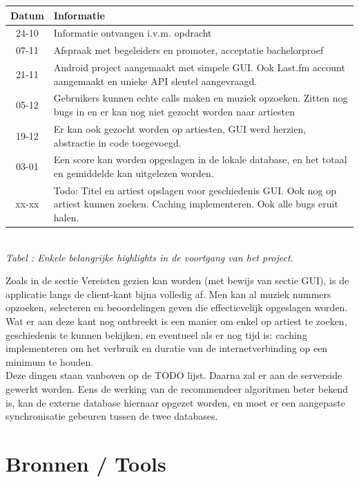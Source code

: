 \documentclass[11pt,a4paper]{article}
\newcounter{tabc}
\newcommand{\tabID} {%
   \stepcounter{tabc}%
   \thetabc}
\begin{document}
	\begin{tabular}{| c | p{\linewidth} | }
	\hline
	Datum & Informatie \\ \hline \hline 
	24-10 & Informatie ontvangen i.v.m. opdracht \\ \hline
	07-11 & Afspraak met begeleiders en promoter, acceptatie bachelorproef \\ \hline
	21-11 & Android project aangemaakt met simpele GUI. Ook Last.fm account aangemaakt en unieke API sleutel aangevraagd. \\ \hline
	05-12 & Gebruikers kunnen echte calls maken en muziek opzoeken. Zitten nog bugs in en er kan nog niet gezocht worden naar artiesten \\ \hline
	19-12 & Er kan ook gezocht worden op artiesten, GUI werd herzien, abstractie in code toegevoegd. \\ \hline
	03-01 & Een score kan worden opgeslagen in de lokale database, en het totaal en gemiddelde kan uitgelezen worden. \\ \hline
	xx-xx & Todo: Titel en artiest opslagen voor geschiedenis GUI. Ook nog op artiest kunnen zoeken. Caching implementeren. Ook alle bugs eruit halen. \\ \hline
	
	\end{tabular} \\ 
	\small \textit{Tabel \tabID : Enkele belangrijke highlights in de voortgang van het project.} \newline \normalsize
	

Zoals in de sectie Vereisten gezien kan worden (met bewijs van sectie GUI), is de applicatie langs de client-kant bijna volledig af. Men kan al muziek nummers opzoeken, selecteren en beoordelingen geven die effectievelijk opgeslagen worden. Wat er aan deze kant nog ontbreekt is een manier om enkel op artiest te zoeken, geschiedenis te kunnen bekijken, en eventueel als er nog tijd is: caching implementeren om het verbruik en duratie van de internetverbinding op een minimum te houden. \\
Deze dingen staan vanboven op de TODO lijst. Daarna zal er aan de serverside gewerkt worden. Eens de werking van de recommendeer algoritmen beter bekend is, kan de externe database hiernaar opgezet worden, en moet er een aangepaste synchronisatie gebeuren tussen de twee databases.
	
\section{Bronnen / Tools}
\end{document}
